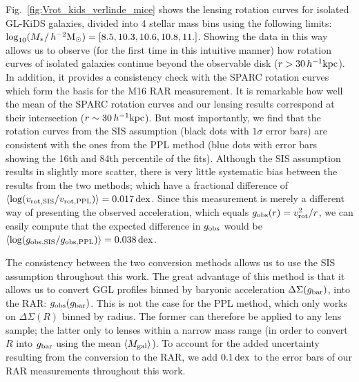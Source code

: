 \documentclass[usenatbib]{mnras}
\newcommand{\hmsun}{\,h^{-2} {\rm M_\odot}}
\newcommand{\hkpc}{\, h^{-1}{\rm{kpc}} }
\newcommand*{\meanb}[1]{\langle{#1}\rangle}
\newcommand{\un}[1]{_{\rm #1}}
\newcommand{\dex}{\, {\rm dex}}
\begin{document}
Fig.~\ref{fig:Vrot_kids_verlinde_mice} shows the lensing rotation curves for isolated GL-KiDS galaxies, divided into 4 stellar mass bins using the following limits: $\log_{10}(M_*/\hmsun) = [8.5,10.3,10.6,10.8,11.]$. Showing the data in this way allows us to observe (for the first time in this intuitive manner) how rotation curves of isolated galaxies continue beyond the observable disk ($r>30\hkpc$). In addition, it provides a consistency check with the SPARC rotation curves \cite[]{lelli2016b} which form the basis for the M16 RAR measurement. It is remarkable how well the mean of the SPARC rotation curves and our lensing results correspond at their intersection ($r\sim 30 \hkpc$). But most importantly, we find that the rotation curves from the SIS assumption (black dots with $1\sigma$ error bars) are consistent with the ones from the PPL method (blue dots with error bars showing the 16th and 84th percentile of the fits). Although the SIS assumption results in slightly more scatter, there is very little systematic bias between the results from the two methods; which have a fractional difference of $\meanb{\log(v\un{rot, SIS} / v\un{rot, PPL})} = 0.017 \dex$. Since this measurement is merely a different way of presenting the observed acceleration, which equals $g\un{obs}(r) = v\un{rot}^2 / r$, we can easily compute that the expected difference in $g\un{obs}$ would be $\meanb{\log(g\un{obs, SIS} / g\un{obs, PPL})} = 0.038 \dex$.

The consistency between the two conversion methods allows us to use the SIS assumption throughout this work. The great advantage of this method is that it allows us to convert GGL profiles binned by baryonic acceleration $\Delta\Sigma(g\un{bar})$, into the RAR: $g\un{obs}(g\un{bar})$. This is not the case for the PPL method, which only works on $\Delta\Sigma(R)$ binned by radius. The former can therefore be applied to any lens sample; the latter only to lenses within a narrow mass range (in order to convert $R$ into $g\un{bar}$ using the mean $\meanb{M\un{gal}}$). To account for the added uncertainty resulting from the conversion to the RAR, we add $0.1 \dex$ to the error bars of our RAR measurements throughout this work.
\end{document}
